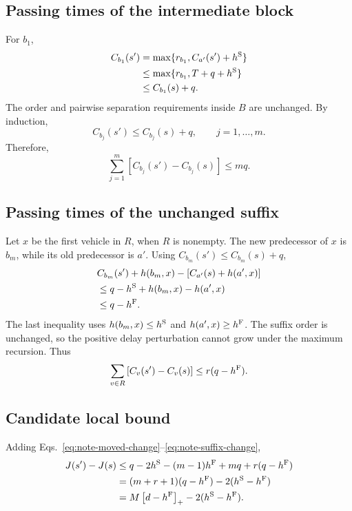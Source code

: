 \subsection*{Passing times of the intermediate block}

For \(b_1\),
\begin{align}
C_{b_1}(s')
&=\max\{r_{b_1},C_{a'}(s')+h^{\mathrm{S}}\}\\
&\le\max\{r_{b_1},T+q+h^{\mathrm{S}}\}\\
&\le C_{b_1}(s)+q.
\end{align}
The order and pairwise separation requirements inside \(B\) are unchanged. By induction,
\begin{equation}
C_{b_j}(s')\le C_{b_j}(s)+q,
\qquad j=1,\ldots,m.
\end{equation}
Therefore,
\begin{equation}
\sum_{j=1}^{m}\left[C_{b_j}(s')-C_{b_j}(s)\right]\le mq.
\label{eq:note-block-change}
\end{equation}

\subsection*{Passing times of the unchanged suffix}

Let \(x\) be the first vehicle in \(R\), when \(R\) is nonempty. The new predecessor of \(x\) is \(b_m\), while its old predecessor is \(a'\). Using \(C_{b_m}(s')\le C_{b_m}(s)+q\),
\begin{align}
&C_{b_m}(s')+h(b_m,x)
-\left[C_{a'}(s)+h(a',x)\right]\\
&\le q-h^{\mathrm{S}}+h(b_m,x)-h(a',x)\\
&\le q-h^{\mathrm{F}}.
\end{align}
The last inequality uses \(h(b_m,x)\le h^{\mathrm{S}}\) and \(h(a',x)\ge h^{\mathrm{F}}\). The suffix order is unchanged, so the positive delay perturbation cannot grow under the maximum recursion. Thus
\begin{equation}
\sum_{v\in R}\left[C_v(s')-C_v(s)\right]
\le r(q-h^{\mathrm{F}}).
\label{eq:note-suffix-change}
\end{equation}

\subsection*{Candidate local bound}

Adding Eqs.~\eqref{eq:note-moved-change}--\eqref{eq:note-suffix-change},
\begin{align}
J(s')-J(s)
&\le q-2h^{\mathrm{S}}-(m-1)h^{\mathrm{F}}+mq+r(q-h^{\mathrm{F}})\\
&=(m+r+1)(q-h^{\mathrm{F}})-2(h^{\mathrm{S}}-h^{\mathrm{F}})\\
&=M\left[d-h^{\mathrm{F}}\right]_{+}-2(h^{\mathrm{S}}-h^{\mathrm{F}}).
\end{align}

